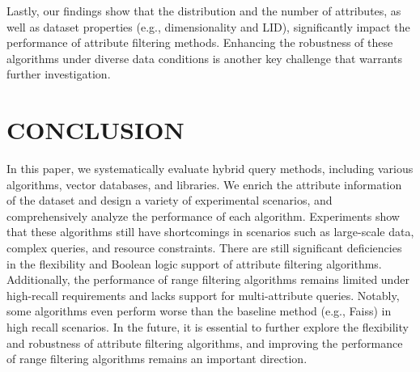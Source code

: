 \documentclass[sigconf, nonacm]{acmart}
\begin{document}
	Lastly, our findings show that the distribution and the number of attributes, as well as dataset properties (e.g., dimensionality and LID), significantly impact the performance of attribute filtering methods. Enhancing the robustness of these algorithms under diverse data conditions is another key challenge that warrants further investigation.
	
	
	\section{CONCLUSION}
	In this paper, we systematically evaluate hybrid query methods, including various algorithms, vector databases, and libraries. We enrich the attribute information of the dataset and design a variety of experimental scenarios, and comprehensively analyze the performance of each algorithm. Experiments show that these algorithms still have shortcomings in scenarios such as large-scale data, complex queries, and resource constraints. There are still significant deficiencies in the flexibility and Boolean logic support of attribute filtering algorithms. Additionally, the performance of range filtering algorithms remains limited under high-recall requirements and lacks support for multi-attribute queries. Notably, some algorithms even perform worse than the baseline method (e.g., Faiss) in high recall scenarios.  In the future, it is essential to further explore the flexibility and robustness of attribute filtering algorithms, and improving the performance of range filtering algorithms remains an important direction.
%	
	
	
	
	\clearpage
	
	
	
\end{document}
